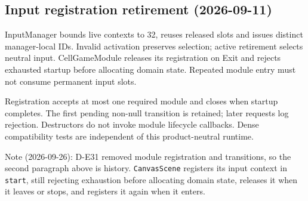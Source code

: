 \subsection{Input registration retirement (2026-09-11)}
InputManager bounds live contexts to 32, reuses released slots and issues distinct
manager-local IDs. Invalid activation preserves selection; active retirement
selects neutral input. CellGameModule releases its registration on Exit and
rejects exhausted startup before allocating domain state. Repeated module entry
must not consume permanent input slots.

Registration accepts at most one required module and closes when startup completes.
The first pending non-null transition is retained; later requests log rejection.
Destructors do not invoke module lifecycle callbacks. Dense compatibility tests
are independent of this product-neutral runtime.

Note (2026-09-26): D-E31 removed module registration and transitions, so the
second paragraph above is history. \texttt{CanvasScene} registers its input
context in \texttt{start}, still rejecting exhaustion before allocating domain
state, releases it when it leaves or stops, and registers it again when it
enters.
